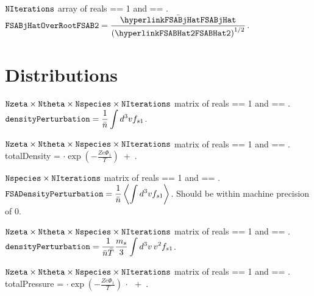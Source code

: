 \myhrule

{$\text{\ttfamily NIterations}$ array of reals}
{ == 1 and  == \true.}
{$\displaystyle \text{\ttfamily FSABjHatOverRootFSAB2} =  \frac{\bar{\text{\parlink{FSABjHat}}}}{\left(\text{\parlink{FSABHat2}}\right)^{1/2}}$.}

\myhrule

\section{Distributions}

\myhrule

{$\text{\ttfamily Nzeta} \times \text{\ttfamily Ntheta} \times \text{\ttfamily Nspecies} \times \text{\ttfamily NIterations}$ matrix of reals}
{ == 1 and  == \true.}
{$\displaystyle \text{\ttfamily densityPerturbation} =  \frac{1}{\bar{n}} \int d^3v f_{s1}$.}

\myhrule

{$\text{\ttfamily Nzeta} \times \text{\ttfamily Ntheta} \times \text{\ttfamily Nspecies} \times \text{\ttfamily NIterations}$ matrix of reals}
{ == 1 and  == \true.}
{{\ttfamily totalDensity} = $\cdot \exp \left(- \frac{Z e \Phi_1}{T}  \right)$~+~.}

\myhrule

{$\text{\ttfamily Nspecies} \times \text{\ttfamily NIterations}$ matrix of reals}
{ == 1 and  == \true.}
{$\displaystyle \text{\ttfamily FSADensityPerturbation} =  \frac{1}{\bar{n}} \left\langle \int d^3v f_{s1} \right\rangle$. 
Should be within machine precision of 0.}

\myhrule

{$\text{\ttfamily Nzeta} \times \text{\ttfamily Ntheta} \times \text{\ttfamily Nspecies} \times \text{\ttfamily NIterations}$ matrix of reals}
{ == 1 and  == \true.}
{$\displaystyle \text{\ttfamily densityPerturbation} =  \frac{1}{\bar{n} \bar{T}} \frac{m_s}{3} \int d^3v \, v^2 f_{s1}$.}

\myhrule

{$\text{\ttfamily Nzeta} \times \text{\ttfamily Ntheta} \times \text{\ttfamily Nspecies} \times \text{\ttfamily NIterations}$ matrix of reals}
{ == 1 and  == \true.}
{{\ttfamily totalPressure} = $\cdot \exp \left(- \frac{Z e \Phi_1}{T}  \right)$ $\cdot$ ~+~.}

